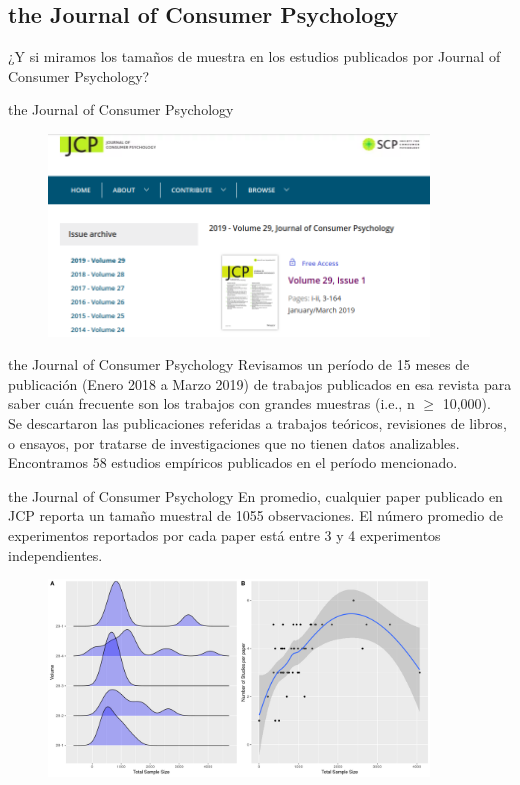 \documentclass{beamer}
\begin{document}
\subsection{the Journal of Consumer Psychology}
\begin{frame}
\Large
\centering
¿Y si miramos los tamaños de muestra en los estudios publicados por Journal of Consumer Psychology?
\end{frame}



\begin{frame}{the Journal of Consumer Psychology}
\begin{figure}
\centering
\includegraphics[width=0.9\textwidth]{JCP.png}
\end{figure}
\end{frame}

\begin{frame}{the Journal of Consumer Psychology}
Revisamos un período de 15 meses de publicación (Enero 2018 a Marzo 2019) de trabajos publicados en esa revista para saber cuán frecuente son los trabajos con grandes muestras (i.e., n $\geq$ 10,000).\\
\vspace{0.8cm}
Se descartaron las publicaciones referidas a trabajos teóricos, revisiones de libros, o ensayos, por tratarse de investigaciones que no tienen datos analizables. Encontramos 58 estudios empíricos publicados en el período mencionado. 
\end{frame}

\begin{frame}{the Journal of Consumer Psychology}
En promedio, cualquier paper publicado en JCP reporta un tamaño muestral de 1055 observaciones. El número promedio de experimentos reportados por cada paper está entre 3 y 4 experimentos independientes.
\begin{figure}
\centering
\includegraphics[width=0.9\textwidth]{Figure1.png}
\end{figure}
\end{frame}
\end{document}

